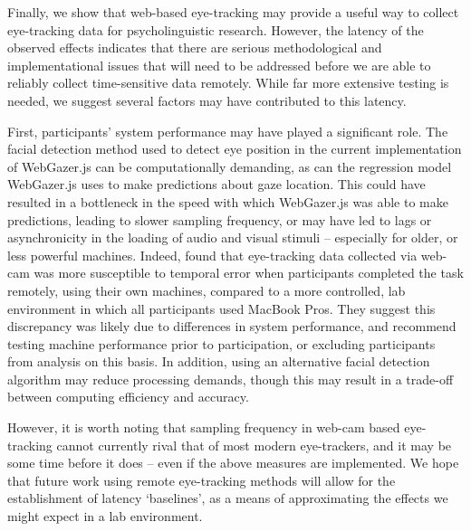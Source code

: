 \documentclass[10pt,letterpaper]{article}
\begin{document}

Finally, we show that web-based eye-tracking may provide a useful way to collect eye-tracking data for psycholinguistic research. However, the latency of the observed effects indicates that there are serious methodological and implementational issues that will need to be addressed before we are able to reliably collect time-sensitive data remotely. While far more extensive testing is needed, we suggest several factors may have contributed to this latency. 

First, participants' system performance may have played a significant role. The facial detection method used to detect eye position in the current implementation of WebGazer.js can be computationally demanding, as can the regression model WebGazer.js uses to make predictions about gaze location. This could have resulted in a bottleneck in the speed with which WebGazer.js was able to make predictions, leading to slower sampling frequency, or may have led to lags or asynchronicity in the loading of audio and visual stimuli -- especially for older, or less powerful machines. Indeed,  found that eye-tracking data collected via web-cam was more susceptible to temporal error when participants completed the task remotely, using their own machines, compared to a more controlled, lab environment in which all participants used MacBook Pros. They suggest this discrepancy was likely due to differences in system performance, and recommend testing machine performance prior to participation, or excluding participants from analysis on this basis. In addition, using an alternative facial detection algorithm may reduce processing demands, though this may result in a trade-off between computing efficiency and accuracy. 

However, it is worth noting that sampling frequency in web-cam based eye-tracking cannot currently rival that of most modern eye-trackers, and it may be some time before it does -- even if the above measures are implemented. We hope that future work using remote eye-tracking methods will allow for the establishment of latency `baselines', as a means of approximating the effects we might expect in a lab environment. %
\end{document}
